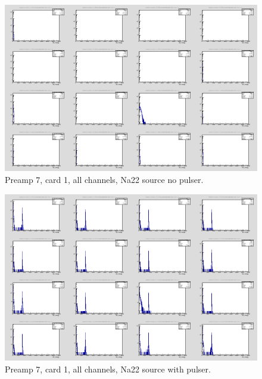 \documentclass{report}
\begin{document}
\begin{figure}[!htb]
  \includegraphics[width=\linewidth]{dr_latest_test/preamp7_lim_energy_card1_all_no_pulser.png}
  \caption{Preamp 7, card 1, all channels, Na22 source  no pulser.}
\end{figure}
\begin{figure}[!htb]
  \includegraphics[width=\linewidth]{dr_latest_test/preamp7_lim_energy_card1_pulser.png}
  \caption{Preamp 7, card 1, all channels, Na22 source with pulser.}
\end{figure}
\newpage
\clearpage
\end{document}
